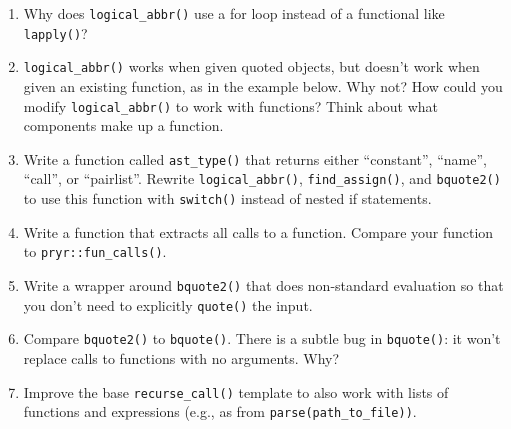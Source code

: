 \begin{enumerate}
\def\labelenumi{\arabic{enumi}.}
\item
  Why does \texttt{logical\_abbr()} use a for loop instead of a
  functional like \texttt{lapply()}?
\item
  \texttt{logical\_abbr()} works when given quoted objects, but doesn't
  work when given an existing function, as in the example below. Why
  not? How could you modify \texttt{logical\_abbr()} to work with
  functions? Think about what components make up a function.

\begin{Shaded}
\begin{Highlighting}[]
\StringTok{ } \NormalTok{) \{}
  \StringTok{ }
\NormalTok{\}}
\end{Highlighting}
\end{Shaded}
\item
  Write a function called \texttt{ast\_type()} that returns either
  ``constant'', ``name'', ``call'', or ``pairlist''. Rewrite
  \texttt{logical\_abbr()}, \texttt{find\_assign()}, and
  \texttt{bquote2()} to use this function with \texttt{switch()} instead
  of nested if statements.
\item
  Write a function that extracts all calls to a function. Compare your
  function to \texttt{pryr::fun\_calls()}.
\item
  Write a wrapper around \texttt{bquote2()} that does non-standard
  evaluation so that you don't need to explicitly \texttt{quote()} the
  input.
\item
  Compare \texttt{bquote2()} to \texttt{bquote()}. There is a subtle bug
  in \texttt{bquote()}: it won't replace calls to functions with no
  arguments. Why?

\begin{Shaded}
\begin{Highlighting}[]
\NormalTok{(} 
\NormalTok{), }\NormalTok{(} 
\end{Highlighting}
\end{Shaded}
\item
  Improve the base \texttt{recurse\_call()} template to also work with
  lists of functions and expressions (e.g., as from
  \texttt{parse(path\_to\_file))}.
\end{enumerate}
